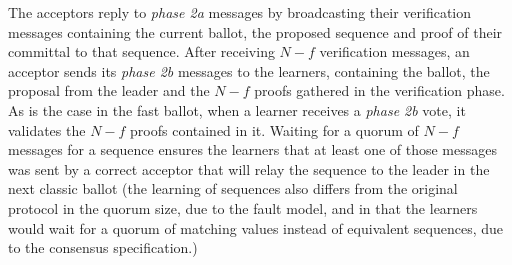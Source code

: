 The acceptors reply to \textit{phase 2a} messages by broadcasting their verification messages containing the current ballot, the proposed sequence and proof of their committal to that sequence. After receiving $N-f$ verification messages, an acceptor sends its \textit{phase 2b} messages to the learners, containing the ballot, the proposal from the leader and the $N-f$ proofs gathered in the verification phase. As is the case in the fast ballot, when a learner receives a \textit{phase 2b} vote, it validates the $N-f$ proofs contained in it. Waiting for a quorum of $N-f$ messages for a sequence ensures the learners that at least one of those messages was sent by a correct acceptor that will relay the sequence to the leader in the next classic ballot (the learning of sequences also differs from the original protocol in the quorum size, due to the fault model, and in that the learners would wait for a quorum of matching values instead of equivalent sequences, due to the consensus specification.)\par

